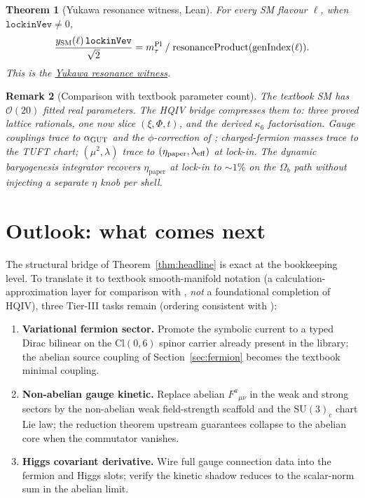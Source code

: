\documentclass[11pt]{amsart}
\newtheorem{theorem}{Theorem}[section]
\newtheorem{remark}[theorem]{Remark}
\begin{document}
\begin{theorem}[Yukawa resonance witness, Lean]
\label{thm:yukawa-resonance-witness}
For every SM flavour $\ell$, when $\texttt{lockinVev}\neq 0$,
\[
\frac{y_{\rm SM}(\ell)\,\texttt{lockinVev}}{\sqrt{2}}
= m_\tau^{\rm Pl}\;/\;\mathrm{resonanceProduct}(\mathrm{genIndex}(\ell)).
\]
This is the \hyperref[lean:yukawa-resonance]{Yukawa resonance witness}.
\end{theorem}

\begin{remark}[Comparison with textbook parameter count]
\label{rem:param-count}
The textbook SM has $\mathcal{O}(20)$ fitted real parameters. The HQIV
bridge compresses them to: three proved lattice rationals, one now slice
$(\xi,\Phi,t)$, and the derived $\kappa_6$ factorisation. Gauge couplings
trace to $\alpha_{\rm GUT}$ and the $\phi$-correction of
\cite{hqiv-oct-action-paper}; charged-fermion masses trace to the TUFT chart;
$(\mu^2,\lambda)$ trace to $(\eta_{\mathrm{paper}},\lambda_{\rm eff})$ at
lock-in. The dynamic baryogenesis integrator recovers
$\eta_{\mathrm{paper}}$ at lock-in to $\sim 1\%$ on the $\Omega_b$ path
without injecting a separate $\eta$ knob per shell.
\end{remark}

\section{Outlook: what comes next}
\label{sec:outlook}

The structural bridge of Theorem~\ref{thm:headline} is exact at the
bookkeeping level. To translate it to textbook smooth-manifold notation (a
calculation-approximation layer for comparison with
\cite{peskin1995,schwartz2014}, \emph{not} a foundational completion of HQIV),
three Tier-III tasks remain (ordering consistent with
\cite{hqiv-oct-action-paper}):

\begin{enumerate}[leftmargin=2em]
\item \textbf{Variational fermion sector.} Promote the symbolic current to a
  typed Dirac bilinear on the Cl$(0,6)$ spinor carrier already present in the
  library; the abelian source coupling of Section~\ref{sec:fermion} becomes
  the textbook minimal coupling.
\item \textbf{Non-abelian gauge kinetic.} Replace abelian $F^a{}_{\mu\nu}$ in
  the weak and strong sectors by the non-abelian weak field-strength scaffold
  and the $\mathrm{SU}(3)_c$ chart Lie law; the reduction theorem upstream
  guarantees collapse to the abelian core when the commutator vanishes.
\item \textbf{Higgs covariant derivative.} Wire full gauge connection data into
  the fermion and Higgs slots; verify the kinetic shadow reduces to the
  scalar-norm sum in the abelian limit.
\end{enumerate}
\end{document}
